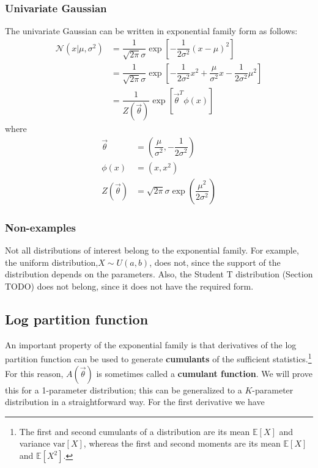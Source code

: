 \begin{refsection}
\subsubsection{Univariate Gaussian}
The univariate Gaussian can be written in exponential family form as follows:
\begin{align}
\mathcal{N}(x|\mu,\sigma^2) & =\dfrac{1}{\sqrt{2\pi}\sigma}\exp\left[-\dfrac{1}{2\sigma^2}(x-\mu)^2\right] \nonumber \\
& = \dfrac{1}{\sqrt{2\pi}\sigma}\exp\left[-\dfrac{1}{2\sigma^2}x^2+\dfrac{\mu}{\sigma^2}x-\dfrac{1}{2\sigma^2}\mu^2\right] \nonumber \\
& = \dfrac{1}{Z(\vec{\theta})}\exp[\vec{\theta}^T\phi(x)]
\end{align}
where
\begin{align}
\vec{\theta} & = (\dfrac{\mu}{\sigma^2}, -\dfrac{1}{2\sigma^2}) \\
\phi(x) & =(x,x^2) \\
Z(\vec{\theta}) & =\sqrt{2\pi}\sigma\exp(\dfrac{\mu^2}{2\sigma^2})
\end{align}


\subsubsection{Non-examples}
Not all distributions of interest belong to the exponential family. For example, the uniform distribution,$X \sim U(a,b)$, does not, since the support of the distribution depends on the parameters. Also, the Student T distribution (Section TODO) does not belong, since it does not have the required form.


\subsection{Log partition function}
An important property of the exponential family is that derivatives of the log partition function can be used to generate \textbf{cumulants} of the sufficient statistics.\footnote{The first and second cumulants of a distribution are its mean $\mathbb{E}[X]$ and variance $\mathrm{var}[X]$, whereas the first and second moments are its mean $\mathbb{E}[X]$ and $\mathbb{E}[X^2]$.} For this reason, $A(\vec{\theta})$ is sometimes called a \textbf{cumulant function}. We will prove this for a 1-parameter distribution; this can be generalized to a $K$-parameter distribution in a straightforward way. For the first derivative we have


\end{refsection}
